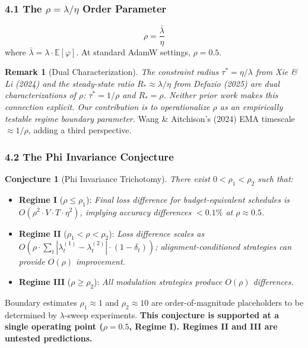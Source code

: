 \documentclass[
]{article}
\providecommand{\tightlist}{%
  \setlength{\itemsep}{0pt}\setlength{\parskip}{0pt}}
\begin{document}
\hypertarget{the-rho-lambdaeta-order-parameter}{%
\subsubsection{\texorpdfstring{4.1 The \(\rho = \lambda/\eta\) Order
Parameter}{4.1 The \textbackslash rho = \textbackslash lambda/\textbackslash eta Order Parameter}}\label{the-rho-lambdaeta-order-parameter}}

\[\rho = \frac{\bar{\lambda}}{\eta}\] where
\(\bar{\lambda} = \lambda \cdot \mathbb{E}[\varphi]\). At standard AdamW
settings, \(\rho = 0.5\).

\textbf{Remark 1} (Dual Characterization). \emph{The constraint radius
\(\tau^* = \eta/\lambda\) from Xie \& Li (2024) and the steady-state
ratio \(R_* \approx \lambda/\eta\) from Defazio (2025) are dual
characterizations of \(\rho\): \(\tau^* = 1/\rho\) and \(R_* = \rho\).
Neither prior work makes this connection explicit. Our contribution is
to operationalize \(\rho\) as an empirically testable regime boundary
parameter.} Wang \& Aitchison's (2024) EMA timescale \(\approx 1/\rho\),
adding a third perspective.

\hypertarget{the-phi-invariance-conjecture}{%
\subsubsection{4.2 The Phi Invariance
Conjecture}\label{the-phi-invariance-conjecture}}

\textbf{Conjecture 1} (Phi Invariance Trichotomy). \emph{There exist
\(0 < \rho_1 < \rho_2\) such that:}

\begin{itemize}
\tightlist
\item
  \textbf{Regime I} (\(\rho \leq \rho_1\)): \emph{Final loss difference
  for budget-equivalent schedules is
  \(O(\rho^2 \cdot V \cdot T \cdot \eta^2)\), implying accuracy
  differences \(< 0.1\%\) at \(\rho \approx 0.5\).}
\item
  \textbf{Regime II} (\(\rho_1 < \rho < \rho_2\)): \emph{Loss difference
  scales as
  \(O(\rho \cdot \sum_t |\lambda_t^{(1)} - \lambda_t^{(2)}| \cdot (1 - \delta_t))\);
  alignment-conditioned strategies can provide \(O(\rho)\) improvement.}
\item
  \textbf{Regime III} (\(\rho \geq \rho_2\)): \emph{All modulation
  strategies produce \(O(\rho)\) differences.}
\end{itemize}

Boundary estimates \(\rho_1 \approx 1\) and \(\rho_2 \approx 10\) are
order-of-magnitude placeholders to be determined by \(\lambda\)-sweep
experiments. \textbf{This conjecture is supported at a single operating
point (\(\rho = 0.5\), Regime I). Regimes II and III are untested
predictions.}
\end{document}
